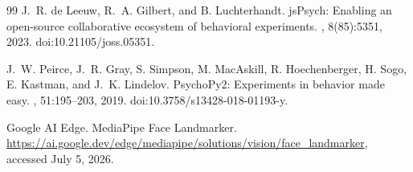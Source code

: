\documentclass[dvipdfmx]{ehis}
\providecommand{\DIFaddbegin}{} %
\providecommand{\DIFaddend}{} %
\providecommand{\DIFaddincludegraphics}[2][]{{\color{blue}\fbox{\DIFOincludegraphics[#1]{#2}}}} %
\DeclareRobustCommand{\DIFaddbegin}{\DIFOaddbegin \let\includegraphics\DIFaddincludegraphics} %
\DeclareRobustCommand{\DIFaddend}{\DIFOaddend \let\includegraphics\DIFOincludegraphics} %
\begin{document}
{\begin{thebibliography}{99}
J.~R. de Leeuw, R.~A. Gilbert, and B. Luchterhandt.
\newblock jsPsych: Enabling an open-source collaborative ecosystem of behavioral experiments.
, 8(85):5351, 2023.
\newblock doi:10.21105/joss.05351.

J.~W. Peirce, J.~R. Gray, S. Simpson, M. MacAskill, R. Hoechenberger, H. Sogo, E. Kastman, and J.~K. Lindelov.
\newblock PsychoPy2: Experiments in behavior made easy.
, 51:195--203, 2019.
\newblock doi:10.3758/s13428-018-01193-y.

Google AI Edge.
\newblock MediaPipe Face Landmarker.
\newblock \url{https://ai.google.dev/edge/mediapipe/solutions/vision/face_landmarker}, accessed July 5, 2026.

\end{thebibliography}
}
\DIFaddbegin 

\begin{biography}
\end{biography}
\DIFaddend 
\end{document}
